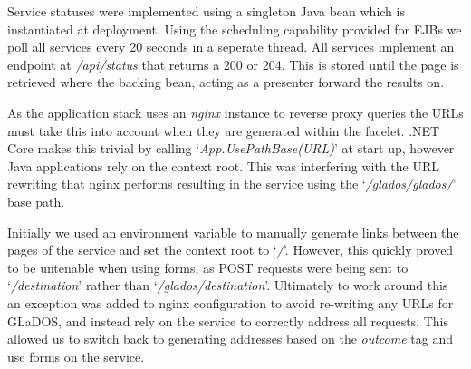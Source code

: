 \par
Service statuses were implemented using a singleton Java bean which is instantiated at deployment. Using the scheduling capability provided for EJBs we poll all services every 20 seconds in a seperate thread. All services implement an endpoint at \textit{/api/status} that returns a 200 or 204. This is stored until the page is retrieved where the backing bean, acting as a presenter forward the results on.

\par
As the application stack uses an \textit{nginx} instance to reverse proxy queries the URLs must take this into account when they are generated within the facelet. .NET Core makes this trivial by calling `\textit{App.UsePathBase(URL)}' at start up, however Java applications rely on the context root. This was interfering with the URL rewriting that nginx performs resulting in the service using the 
`\textit{/glados/glados/}' base path.

\par
Initially we used an environment variable to manually generate links between the pages of the service and set the context root to 
`\textit{/}'. However, this quickly proved to be untenable when using forms, as POST requests were being sent to 
`\textit{/destination}' 
rather than 
`\textit{/glados/destination}'. Ultimately to work around this an exception was added to nginx configuration to avoid re-writing any URLs for GLaDOS, and instead rely on the service to correctly address all requests. This allowed us to switch back to generating addresses based on the \textit{outcome} tag and use forms on the service.